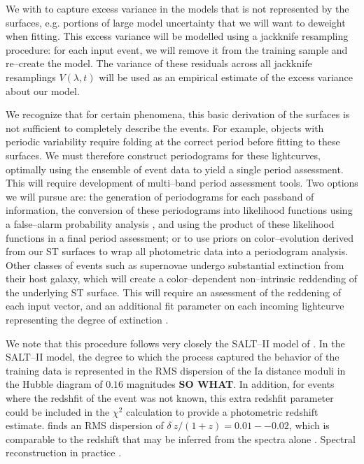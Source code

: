  We with to capture excess
variance in the models that is not represented by the surfaces, e.g. portions of
large model uncertainty that we will want to deweight when fitting.  This excess
variance will be modelled using a jackknife resampling procedure: for each input
event, we will remove it from the training sample and re--create the model.  The
variance of these residuals across all jackknife resamplings $V(\lambda, t)$
will be used as an empirical estimate of the excess variance about our model.

 We recognize that for certain
phenomena, this basic derivation of the surfaces is not sufficient to completely
describe the events. For example, objects with periodic variability require
folding at the correct period before fitting to these surfaces.  We must
therefore construct periodograms for these lightcurves, optimally using the
ensemble of event data to yield a single period assessment.  This will require
development of multi--band period assessment tools.  Two options we will pursue
are: the generation of periodograms for each passband of information, the
conversion of these periodograms into likelihood functions using a false--alarm
probability analysis \citep[e.g.][and references therein]{2009A&A...496..577Z},
and using the product of these likelihood functions in a final period
assessment; or to use priors on color--evolution derived from our ST surfaces to
wrap all photometric data into a periodogram analysis.  Other classes of events
such as supernovae undergo substantial extinction from their host galaxy, which
will create a color--dependent non--intrinsic reddending of the underlying ST
surface.  This will require an assessment of the reddening of each input vector,
and an additional fit parameter on each incoming lightcurve representing the
degree of extinction \cite[Equation 1][]{2007A&A...466...11G}.

 We note that this procedure follows very closely
the SALT--II model of \cite{2007A&A...466...11G}.  In the SALT--II model, the
degree to which the process captured the behavior of the training data is
represented in the RMS dispersion of the Ia distance moduli in the Hubble
diagram of $0.16$ magnitudes {\bf SO WHAT}.  In addition, for events where the
redshfit of the event was not known, this extra redshfit parameter could be
included in the $\chi^2$ calculation to provide a photometric redshift estimate.
\cite{2007A&A...466...11G} finds an RMS dispersion of $\delta~z/(1 + z) =
0.01--0.02$, which is comparable to the redshift that may be inferred from the
spectra alone \citep[see also][]{2010ApJ...717...40K}.
Spectral reconstruction in practice \citep{2010ApJ...719.1759A}.

